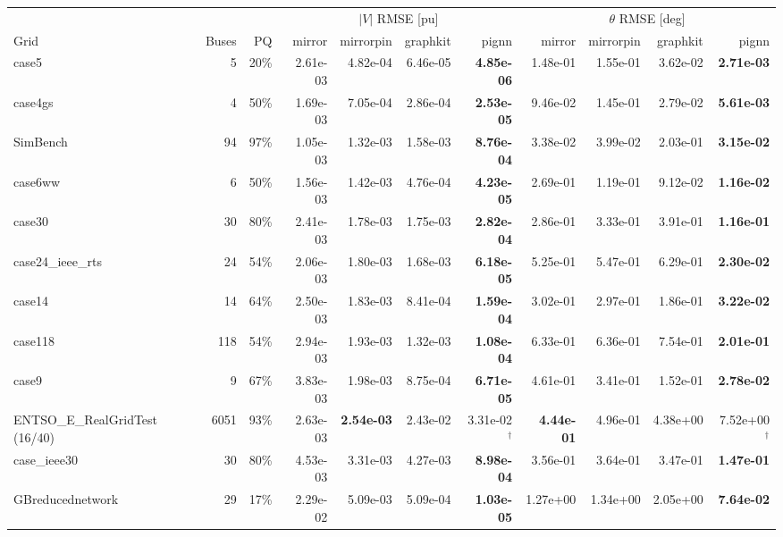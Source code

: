 \documentclass[10pt]{article}
\begin{document}
\begin{landscape}
\begin{table}[H]
\centering\scriptsize
\begin{tabular}{lrr rrrr rrrr}
\toprule
 & & & \multicolumn{4}{c}{$|V|$ RMSE [pu]} & \multicolumn{4}{c}{$\theta$ RMSE [deg]} \\
\cmidrule(lr){4-7}\cmidrule(lr){8-11}
Grid & Buses & PQ & mirror & mirrorpin & graphkit & pignn & mirror & mirrorpin & graphkit & pignn \\
\midrule
case5 & 5 & 20\% & 2.61e-03 & 4.82e-04 & 6.46e-05 & \textbf{4.85e-06} & 1.48e-01 & 1.55e-01 & 3.62e-02 & \textbf{2.71e-03} \\
case4gs & 4 & 50\% & 1.69e-03 & 7.05e-04 & 2.86e-04 & \textbf{2.53e-05} & 9.46e-02 & 1.45e-01 & 2.79e-02 & \textbf{5.61e-03} \\
SimBench & 94 & 97\% & 1.05e-03 & 1.32e-03 & 1.58e-03 & \textbf{8.76e-04} & 3.38e-02 & 3.99e-02 & 2.03e-01 & \textbf{3.15e-02} \\
case6ww & 6 & 50\% & 1.56e-03 & 1.42e-03 & 4.76e-04 & \textbf{4.23e-05} & 2.69e-01 & 1.19e-01 & 9.12e-02 & \textbf{1.16e-02} \\
case30 & 30 & 80\% & 2.41e-03 & 1.78e-03 & 1.75e-03 & \textbf{2.82e-04} & 2.86e-01 & 3.33e-01 & 3.91e-01 & \textbf{1.16e-01} \\
case24\_ieee\_rts & 24 & 54\% & 2.06e-03 & 1.80e-03 & 1.68e-03 & \textbf{6.18e-05} & 5.25e-01 & 5.47e-01 & 6.29e-01 & \textbf{2.30e-02} \\
case14 & 14 & 64\% & 2.50e-03 & 1.83e-03 & 8.41e-04 & \textbf{1.59e-04} & 3.02e-01 & 2.97e-01 & 1.86e-01 & \textbf{3.22e-02} \\
case118 & 118 & 54\% & 2.94e-03 & 1.93e-03 & 1.32e-03 & \textbf{1.08e-04} & 6.33e-01 & 6.36e-01 & 7.54e-01 & \textbf{2.01e-01} \\
case9 & 9 & 67\% & 3.83e-03 & 1.98e-03 & 8.75e-04 & \textbf{6.71e-05} & 4.61e-01 & 3.41e-01 & 1.52e-01 & \textbf{2.78e-02} \\
ENTSO\_E\_RealGridTest\,(16/40) & 6051 & 93\% & 2.63e-03 & \textbf{2.54e-03} & 2.43e-02 & 3.31e-02$^\dagger$ & \textbf{4.44e-01} & 4.96e-01 & 4.38e+00 & 7.52e+00$^\dagger$ \\
case\_ieee30 & 30 & 80\% & 4.53e-03 & 3.31e-03 & 4.27e-03 & \textbf{8.98e-04} & 3.56e-01 & 3.64e-01 & 3.47e-01 & \textbf{1.47e-01} \\
GBreducednetwork & 29 & 17\% & 2.29e-02 & 5.09e-03 & 5.09e-04 & \textbf{1.03e-05} & 1.27e+00 & 1.34e+00 & 2.05e+00 & \textbf{7.64e-02} \\

\end{tabular}
\end{table}
\end{landscape}
\end{document}
